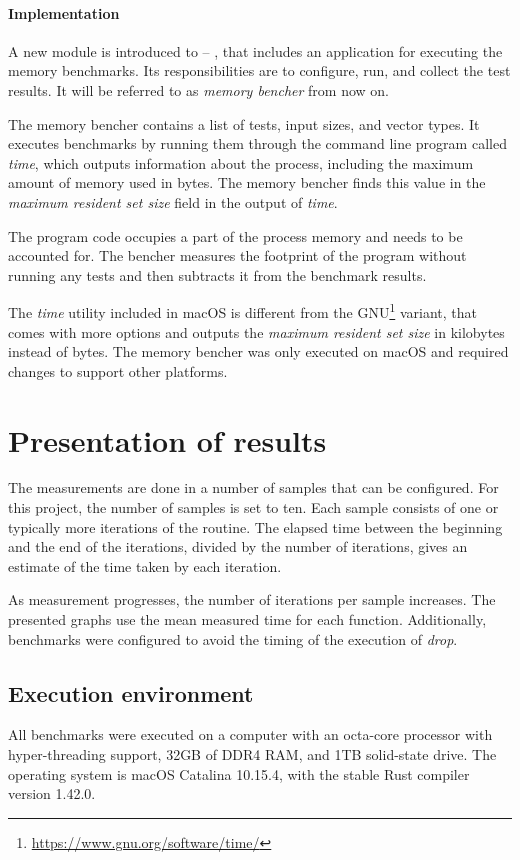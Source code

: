 \paragraph{Implementation}
A new module is introduced to \pvecrs{} -- , that includes an application for executing the memory benchmarks. Its responsibilities are to configure, run, and collect the test results. It will be referred to as \emph{memory bencher} from now on.

The memory bencher contains a list of tests, input sizes, and vector types. It executes benchmarks by running them through the command line program called \emph{time}, which outputs information about the process, including the maximum amount of memory used in bytes. The memory bencher finds this value in the \emph{maximum resident set size} field in the output of \emph{time}.

The program code occupies a part of the process memory and needs to be accounted for. The bencher measures the footprint of the program without running any tests and then subtracts it from the benchmark results.

The \emph{time} utility included in macOS is different from the GNU\footnote{\url{https://www.gnu.org/software/time/}} variant, that comes with more options and outputs the \emph{maximum resident set size} in kilobytes instead of bytes. The memory bencher was only executed on macOS and required changes to support other platforms.

\section{Presentation of results}
The measurements are done in a number of samples that can be configured. For this project, the number of samples is set to ten. Each sample consists of one or typically more iterations of the routine. The elapsed time between the beginning and the end of the iterations, divided by the number of iterations, gives an estimate of the time taken by each iteration.

As measurement progresses, the number of iterations per sample increases. The presented graphs use the mean measured time for each function. Additionally, benchmarks were configured to avoid the timing of the execution of \emph{drop}.

\subsection{Execution environment}
All benchmarks were executed on a computer with an octa-core processor with hyper-threading support, 32GB of DDR4 RAM, and 1TB solid-state drive. The operating system is macOS Catalina 10.15.4, with the stable Rust compiler version 1.42.0.

